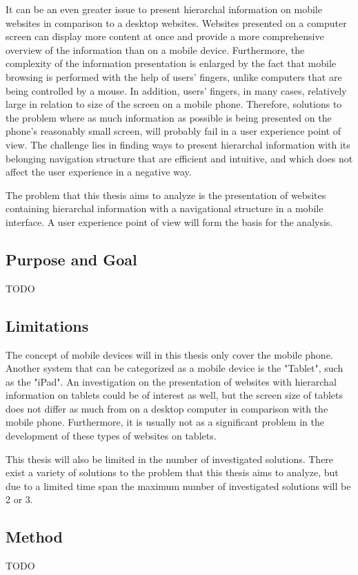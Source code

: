 It can be an even greater issue to present hierarchal information on mobile websites in comparison to a desktop websites. Websites presented on a computer screen can display more content at once and provide a more comprehensive overview of the information than on a mobile device. Furthermore, the complexity of the information presentation is enlarged by the fact that mobile browsing is performed with the help of users’ fingers, unlike computers that are being controlled by a mouse. In addition, users’ fingers, in many cases, relatively large in relation to size of the screen on a mobile phone. Therefore, solutions to the problem where as much information as possible is being presented on the phone's reasonably small screen, will probably fail in a user experience point of view. The challenge lies in finding ways to present hierarchal information with its belonging navigation structure that are efficient and intuitive, and which does not affect the user experience in a negative way. 

The problem that this thesis aims to analyze is the presentation of websites containing hierarchal information with a navigational structure in a mobile interface. A user experience point of view will form the basis for the analysis.

\subsection{Purpose and Goal}
TODO
\subsection{Limitations}
The concept of mobile devices will in this thesis only cover the mobile phone. Another system that can be categorized as a mobile device is the "Tablet", such as the "iPad". An investigation on the presentation of websites with hierarchal information on tablets could be of interest as well, but the screen size of tablets does not differ as much from on a desktop computer in comparison with the mobile phone. Furthermore, it is usually not as a significant problem in the development of these types of websites on tablets.

This thesis will also be limited in the number of investigated solutions. There exist a variety of solutions to the problem that this thesis aims to analyze, but due to a limited time span the maximum number of investigated solutions will be 2 or 3.

\subsection{Method}
TODO